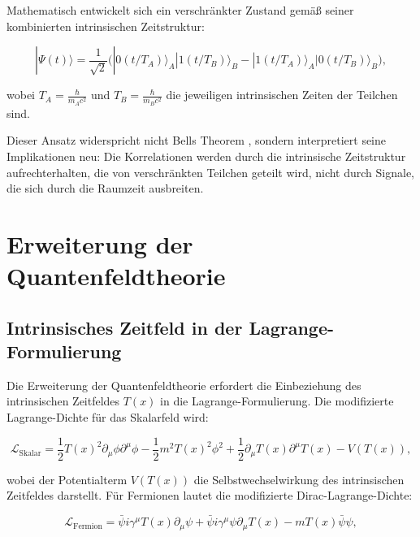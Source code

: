 \documentclass[12pt,a4paper]{article}
\newcommand{\Tfield}{T(x)}
\begin{document}
	Mathematisch entwickelt sich ein verschränkter Zustand gemäß seiner kombinierten intrinsischen Zeitstruktur:
	
	\begin{equation}
		|\Psi(t)\rangle = \frac{1}{\sqrt{2}} \Big( |0(t/T_A)\rangle_A |1(t/T_B)\rangle_B - |1(t/T_A)\rangle_A |0(t/T_B)\rangle_B \Big),
		\label{eq:time_entangled_evolution}
	\end{equation}
	
	wobei $T_A = \frac{\hbar}{m_A c^2}$ und $T_B = \frac{\hbar}{m_B c^2}$ die jeweiligen intrinsischen Zeiten der Teilchen sind.
	
	Dieser Ansatz widerspricht nicht Bells Theorem \cite{Bell1964, Bell1987}, sondern interpretiert seine Implikationen neu: Die Korrelationen werden durch die intrinsische Zeitstruktur aufrechterhalten, die von verschränkten Teilchen geteilt wird, nicht durch Signale, die sich durch die Raumzeit ausbreiten.
	
	\section{Erweiterung der Quantenfeldtheorie}
	\label{sec:qft_extension}
	
	\subsection{Intrinsisches Zeitfeld in der Lagrange-Formulierung}
	\label{subsec:intrinsic_lagrangian}
	
	Die Erweiterung der Quantenfeldtheorie erfordert die Einbeziehung des intrinsischen Zeitfeldes $\Tfield$ in die Lagrange-Formulierung. Die modifizierte Lagrange-Dichte für das Skalarfeld wird:
	
	\begin{equation}
		\mathcal{L}_{\text{Skalar}} = \frac{1}{2} \Tfield^2 \partial_\mu\phi \partial^\mu\phi - \frac{1}{2}m^2\Tfield^2\phi^2 + \frac{1}{2}\partial_\mu\Tfield\partial^\mu\Tfield - V(\Tfield),
		\label{eq:scalar_lagrangian}
	\end{equation}
	
	wobei der Potentialterm $V(\Tfield)$ die Selbstwechselwirkung des intrinsischen Zeitfeldes darstellt. Für Fermionen lautet die modifizierte Dirac-Lagrange-Dichte:
	
	\begin{equation}
		\mathcal{L}_{\text{Fermion}} = \bar{\psi} i \gamma^\mu \Tfield \partial_\mu \psi + \bar{\psi} i \gamma^\mu \psi \partial_\mu \Tfield - m\Tfield\bar{\psi}\psi,
		\label{eq:fermion_lagrangian}
	\end{equation}
	
\end{document}
